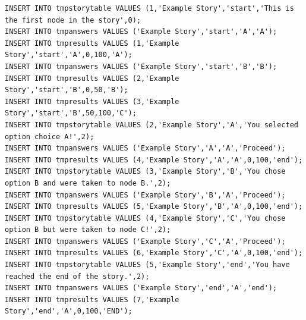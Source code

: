 \documentclass[12pt,letterpaper]{article}
\begin{document}
\begin{lstlisting}[breaklines=true, caption=Set of generated SQL statements.]
INSERT INTO tmpstorytable VALUES (1,'Example Story','start','This is the first node in the story',0);
INSERT INTO tmpanswers VALUES ('Example Story','start','A','A');
INSERT INTO tmpresults VALUES (1,'Example Story','start','A',0,100,'A');
INSERT INTO tmpanswers VALUES ('Example Story','start','B','B');
INSERT INTO tmpresults VALUES (2,'Example Story','start','B',0,50,'B');
INSERT INTO tmpresults VALUES (3,'Example Story','start','B',50,100,'C');
INSERT INTO tmpstorytable VALUES (2,'Example Story','A','You selected option choice A!',2);
INSERT INTO tmpanswers VALUES ('Example Story','A','A','Proceed');
INSERT INTO tmpresults VALUES (4,'Example Story','A','A',0,100,'end');
INSERT INTO tmpstorytable VALUES (3,'Example Story','B','You chose option B and were taken to node B.',2);
INSERT INTO tmpanswers VALUES ('Example Story','B','A','Proceed');
INSERT INTO tmpresults VALUES (5,'Example Story','B','A',0,100,'end');
INSERT INTO tmpstorytable VALUES (4,'Example Story','C','You chose option B but were taken to node C!',2);
INSERT INTO tmpanswers VALUES ('Example Story','C','A','Proceed');
INSERT INTO tmpresults VALUES (6,'Example Story','C','A',0,100,'end');
INSERT INTO tmpstorytable VALUES (5,'Example Story','end','You have reached the end of the story.',2);
INSERT INTO tmpanswers VALUES ('Example Story','end','A','end');
INSERT INTO tmpresults VALUES (7,'Example Story','end','A',0,100,'END');
\end{lstlisting}
\end{document}

